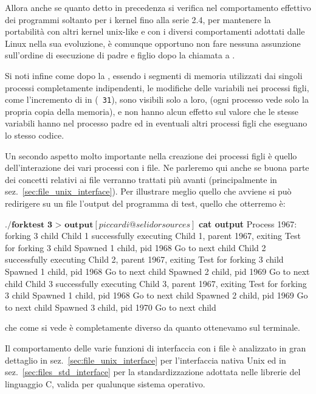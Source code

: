 Allora anche se quanto detto in precedenza si verifica nel comportamento
effettivo dei programmi soltanto per i kernel fino alla serie 2.4, per
mantenere la portabilità con altri kernel unix-like e con i diversi
comportamenti adottati dalle Linux nella sua evoluzione, è comunque opportuno
non fare nessuna assunzione sull'ordine di esecuzione di padre e figlio dopo
la chiamata a .

Si noti infine come dopo la , essendo i segmenti di memoria
utilizzati dai singoli processi completamente indipendenti, le modifiche delle
variabili nei processi figli, come l'incremento di  in (\texttt{\small
  31}), sono visibili solo a loro, (ogni processo vede solo la propria copia
della memoria), e non hanno alcun effetto sul valore che le stesse variabili
hanno nel processo padre ed in eventuali altri processi figli che eseguano lo
stesso codice.

Un secondo aspetto molto importante nella creazione dei processi figli è
quello dell'interazione dei vari processi con i file. Ne parleremo qui anche
se buona parte dei concetti relativi ai file verranno trattati più avanti
(principalmente in sez.~\ref{sec:file_unix_interface}). Per illustrare meglio
quello che avviene si può redirigere su un file l'output del programma di
test, quello che otterremo è:
\begin{Console}
$ \textbf{./forktest 3 > output}
[piccardi@selidor sources]$ \textbf{cat output}
Process 1967: forking 3 child
Child 1 successfully executing
Child 1, parent 1967, exiting
Test for forking 3 child
Spawned 1 child, pid 1968 
Go to next child 
Child 2 successfully executing
Child 2, parent 1967, exiting
Test for forking 3 child
Spawned 1 child, pid 1968 
Go to next child 
Spawned 2 child, pid 1969 
Go to next child 
Child 3 successfully executing
Child 3, parent 1967, exiting
Test for forking 3 child
Spawned 1 child, pid 1968 
Go to next child 
Spawned 2 child, pid 1969 
Go to next child 
Spawned 3 child, pid 1970 
Go to next child 
\end{Console}
che come si vede è completamente diverso da quanto ottenevamo sul terminale.

Il comportamento delle varie funzioni di interfaccia con i file è analizzato
in gran dettaglio in sez.~\ref{sec:file_unix_interface} per l'interfaccia
nativa Unix ed in sez.~\ref{sec:files_std_interface} per la standardizzazione
adottata nelle librerie del linguaggio C, valida per qualunque sistema
operativo.

